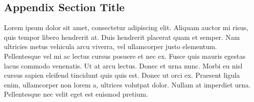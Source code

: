 \documentclass[
12pt, %
a4paper, %
fleqn,   %
]{notes}
\begin{document}
\begin{appendices}
    \section{Appendix Section Title}
    Lorem ipsum dolor sit amet, consectetur adipiscing elit. Aliquam auctor mi
    risus, quis tempor libero hendrerit at. Duis hendrerit placerat quam et
    semper. Nam ultricies metus vehicula arcu viverra, vel ullamcorper justo
    elementum. Pellentesque vel mi ac lectus cursus posuere et nec ex. Fusce
    quis mauris egestas lacus commodo venenatis. Ut at arcu lectus. Donec et
    urna nunc. Morbi eu nisl cursus sapien eleifend tincidunt quis quis est.
    Donec ut orci ex. Praesent ligula enim, ullamcorper non lorem a, ultrices
    volutpat dolor. Nullam at imperdiet urna. Pellentesque nec velit eget est
    euismod pretium.
\end{appendices}

\end{document}
